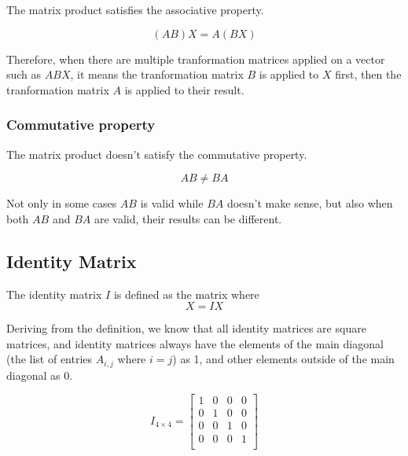 \documentclass{article}
\begin{document}
The matrix product satisfies the associative property.

\[
  (AB)X = A(BX)
\]

Therefore, when there are multiple tranformation matrices applied on a vector 
such as $ABX$, it means the tranformation matrix $B$ is applied to $X$ first, 
then the tranformation matrix $A$ is applied to their result.

\subsubsection{Commutative property}

The matrix product doesn't satisfy the commutative property.

\[
  AB \neq BA
\]

Not only in some cases $AB$ is valid while $BA$ doesn't make sense, but also 
when both $AB$ and $BA$ are valid, their results can be different.

\subsection{Identity Matrix}

The identity matrix $I$ is defined as the matrix where
\[
  X = IX
\]

Deriving from the definition, we know that all identity matrices are square 
matrices, and identity matrices always have the elements of the main diagonal 
(the list of entries $A_{i,j}$ where $i = j$) as 1, and other elements outside 
of the main diagonal as 0.

\[
  I_{4 \times 4} = 
  \begin{bmatrix}
    1 & 0 & 0 & 0 \\
    0 & 1 & 0 & 0 \\
    0 & 0 & 1 & 0 \\
    0 & 0 & 0 & 1 \\
  \end{bmatrix}
\]
\end{document}
